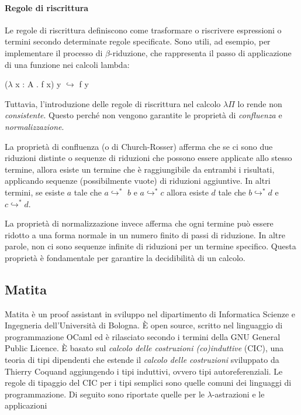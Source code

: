 \documentclass[12pt,a4paper]{mimosis}
\begin{document}
\begin{prooftree}
\end{prooftree}


\begin{prooftree}
\end{prooftree}

\paragraph{Regole di riscrittura}
Le regole di riscrittura definiscono come trasformare o riscrivere espressioni
o termini secondo determinate regole specificate. Sono utili, ad esempio, per
implementare il processo di $\beta$-riduzione, che rappresenta il passo di 
applicazione di una funzione nei calcoli lambda:
\begin{center}
  ($\lambda$ x : A . f x) y $\hookrightarrow$ f y
\end{center}
Tuttavia, l'introduzione delle regole di riscrittura nel calcolo $\lambda\Pi$ 
lo rende non \textit{consistente}. Questo perché non vengono garantite le proprietà
di \textit{confluenza} e \textit{normalizzazione}.

La proprietà di confluenza (o di Church-Rosser) afferma che se ci sono due riduzioni distinte o sequenze di riduzioni
che possono essere applicate allo stesso termine, allora esiste un termine che
è raggiungibile da entrambi i risultati, applicando sequenze (possibilmente vuote)
di riduzioni aggiuntive. In altri termini, se esiste $a$ tale che $a \hookrightarrow^*$
$b$ e $a \hookrightarrow^*c$ allora esiste $d$ tale che $b \hookrightarrow^*d$ e
$c \hookrightarrow^* d$.

La proprietà di normalizzazione invece afferma che ogni termine può essere 
ridotto a una forma normale in un numero finito di passi di riduzione. In altre
parole, non ci sono sequenze infinite di riduzioni per un termine specifico. 
Questa proprietà è fondamentale per garantire la decidibilità di un calcolo. 

\subsection{Matita}
Matita è un  proof assistant in sviluppo nel dipartimento di Informatica Scienze
e Ingegneria dell'Università di Bologna. È open source, scritto nel linguaggio di
programmazione OCaml ed è rilasciato secondo i termini della GNU General Public Licence.
È basato sul \textit{calcolo delle costruzioni (co)induttive} (CIC), una teoria di tipi
dipendenti che estende il \textit{calcolo delle costruzioni} sviluppato da
Thierry Coquand aggiungendo i tipi induttivi, ovvero tipi autoreferenziali.
Le regole di tipaggio del CIC per i tipi semplici sono quelle comuni dei linguaggi
di programmazione. Di seguito sono riportate quelle per le  $\lambda$-astrazioni
e le applicazioni 
\end{document}
